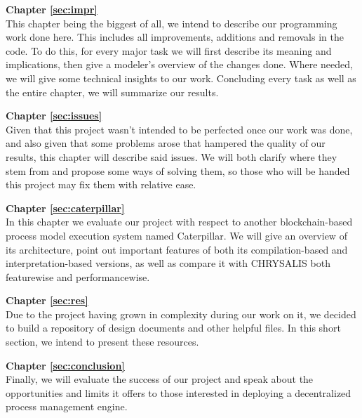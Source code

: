 \textbf{Chapter \ref{sec:impr}} \\[0.2em]
This chapter being the biggest of all, we intend to describe our programming work done here. This includes all improvements, additions and removals in the code. To do this, for every major task we will first describe its meaning and implications, then give a modeler's overview of the changes done. Where needed, we will give some technical insights to our work. Concluding every task as well as the entire chapter, we will summarize our results.

\textbf{Chapter \ref{sec:issues}} \\[0.2em]
Given that this project wasn't intended to be perfected once our work was done, and also given that some problems arose that hampered the quality of our results, this chapter will describe said issues. We will both clarify where they stem from and propose some ways of solving them, so those who will be handed this project may fix them with relative ease.

\textbf{Chapter \ref{sec:caterpillar}} \\[0.2em]
In this chapter we evaluate our project with respect to another blockchain-based process model execution system named Caterpillar. We will give an overview of its architecture, point out important features of both its compilation-based and interpretation-based versions, as well as compare it with CHRYSALIS both featurewise and performancewise.

\textbf{Chapter \ref{sec:res}} \\[0.2em]
Due to the project having grown in complexity during our work on it, we decided to build a repository of design documents and other helpful files. In this short section, we intend to present these resources.

\textbf{Chapter \ref{sec:conclusion}} \\[0.2em]
Finally, we will evaluate the success of our project and speak about the opportunities and limits it offers to those interested in deploying a decentralized process management engine.
